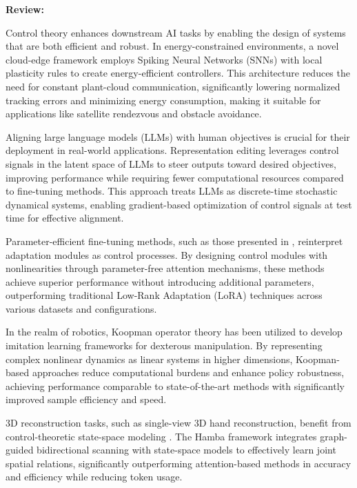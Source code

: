 \documentclass{article}
\theoremstyle{plain}
\theoremstyle{definition}
\theoremstyle{remark}
\begin{document}
\textbf{Review:}

Control theory enhances downstream AI tasks by enabling the design of systems that are both efficient and robust. In energy-constrained environments, a novel cloud-edge framework \cite{ahmadvandCloudedgeFrameworkEnergyefficient2024} employs Spiking Neural Networks (SNNs) with local plasticity rules to create energy-efficient controllers. This architecture reduces the need for constant plant-cloud communication, significantly lowering normalized tracking errors and minimizing energy consumption, making it suitable for applications like satellite rendezvous and obstacle avoidance.

Aligning large language models (LLMs) with human objectives is crucial for their deployment in real-world applications. Representation editing \cite{kongAligningLargeLanguage2024} leverages control signals in the latent space of LLMs to steer outputs toward desired objectives, improving performance while requiring fewer computational resources compared to fine-tuning methods. This approach treats LLMs as discrete-time stochastic dynamical systems, enabling gradient-based optimization of control signals at test time for effective alignment.

Parameter-efficient fine-tuning methods, such as those presented in \cite{zhangParameterefficientFinetuningControls}, reinterpret adaptation modules as control processes. By designing control modules with nonlinearities through parameter-free attention mechanisms, these methods achieve superior performance without introducing additional parameters, outperforming traditional Low-Rank Adaptation (LoRA) techniques across various datasets and configurations.

In the realm of robotics, Koopman operator theory \cite{hanUtilityKoopmanOperator2023} has been utilized to develop imitation learning frameworks for dexterous manipulation. By representing complex nonlinear dynamics as linear systems in higher dimensions, Koopman-based approaches reduce computational burdens and enhance policy robustness, achieving performance comparable to state-of-the-art methods with significantly improved sample efficiency and speed.

3D reconstruction tasks, such as single-view 3D hand reconstruction, benefit from control-theoretic state-space modeling \cite{dongHambaSingleview3D2024}. The Hamba framework integrates graph-guided bidirectional scanning with state-space models to effectively learn joint spatial relations, significantly outperforming attention-based methods in accuracy and efficiency while reducing token usage.
\end{document}
